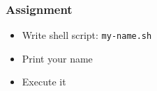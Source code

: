 \documentclass[17pt]{beamer}
\begin{document}
\begin{frame}[fragile]
  \frametitle{Assignment}
  \begin{itemize}[<+-|alert@+>]
  \item Write shell script: {\tt my-name.sh}
  \item Print your name
  \item Execute it
  \end{itemize}
\end{frame}




\end{document}
